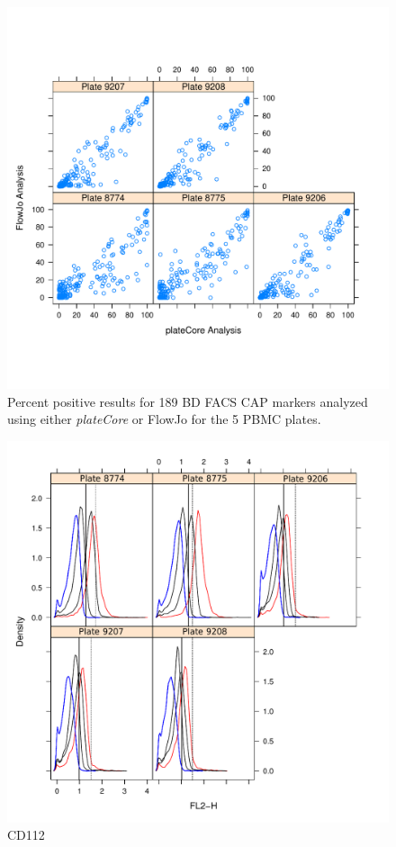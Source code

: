 \documentclass[12pt]{article}
\newcommand{\Rpackage}[1]{{\textit{#1}}}
\begin{document}
\begin{figure}
\centering
\includegraphics{fjVSr.pdf}
\caption{Percent positive results for 189 BD FACS CAP markers analyzed using
either \Rpackage{plateCore} or FlowJo for the 5 PBMC plates. }
\label{fig:pcVSman}
\end{figure}

\begin{figure}
\centering
\includegraphics{fjVSr3.pdf}
\caption{CD112}
\label{fig:pcVSman}
\end{figure}
\end{document}
